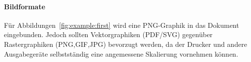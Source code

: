 \paragraph{Bildformate}

Für Abbildungen~\ref{fig:example:first} wird eine PNG-Graphik
in das Dokument eingebunden.
Jedoch sollten Vektorgraphiken (PDF/SVG) gegenüber Rastergraphiken (PNG,GIF,JPG)
bevorzugt werden, da der Drucker und andere Ausgabegeräte selbstständig eine
angemessene Skalierung vornehmen können.
